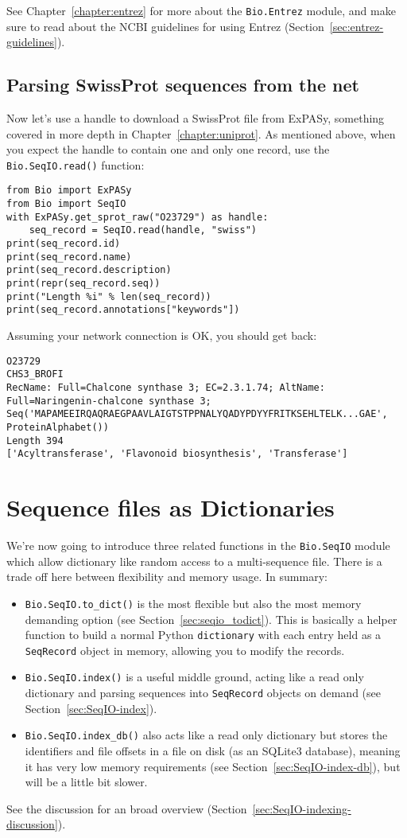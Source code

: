 See Chapter~\ref{chapter:entrez} for more about the \verb|Bio.Entrez| module, and make sure to read about the NCBI guidelines for using Entrez (Section~\ref{sec:entrez-guidelines}).

\subsection{Parsing SwissProt sequences from the net}
\label{sec:SeqIO_ExPASy_and_SwissProt}
Now let's use a handle to download a SwissProt file from ExPASy,
something covered in more depth in Chapter~\ref{chapter:uniprot}.
As mentioned above, when you expect the handle to contain one and only one record,
use the \verb|Bio.SeqIO.read()| function:

\begin{verbatim}
from Bio import ExPASy
from Bio import SeqIO
with ExPASy.get_sprot_raw("O23729") as handle:
    seq_record = SeqIO.read(handle, "swiss")
print(seq_record.id)
print(seq_record.name)
print(seq_record.description)
print(repr(seq_record.seq))
print("Length %i" % len(seq_record))
print(seq_record.annotations["keywords"])
\end{verbatim}

\noindent Assuming your network connection is OK, you should get back:

\begin{verbatim}
O23729
CHS3_BROFI
RecName: Full=Chalcone synthase 3; EC=2.3.1.74; AltName: Full=Naringenin-chalcone synthase 3;
Seq('MAPAMEEIRQAQRAEGPAAVLAIGTSTPPNALYQADYPDYYFRITKSEHLTELK...GAE', ProteinAlphabet())
Length 394
['Acyltransferase', 'Flavonoid biosynthesis', 'Transferase']
\end{verbatim}

\section{Sequence files as Dictionaries}

We're now going to introduce three related functions in the \verb|Bio.SeqIO|
module which allow dictionary like random access to a multi-sequence file.
There is a trade off here between flexibility and memory usage. In summary:
\begin{itemize}
\item \verb|Bio.SeqIO.to_dict()| is the most flexible but also the most
memory demanding option (see Section~\ref{sec:seqio_todict}). This is basically
a helper function to build a normal Python \verb|dictionary| with each entry
held as a \verb|SeqRecord| object in memory, allowing you to modify the
records.
\item \verb|Bio.SeqIO.index()| is a useful middle ground, acting like a
read only dictionary and parsing sequences into \verb|SeqRecord| objects
on demand (see Section~\ref{sec:SeqIO-index}).
\item \verb|Bio.SeqIO.index_db()| also acts like a read only dictionary
but stores the identifiers and file offsets in a file on disk (as an
SQLite3 database), meaning it has very low memory requirements (see
Section~\ref{sec:SeqIO-index-db}), but will be a little bit slower.
\end{itemize}
See the discussion for an broad overview
(Section~\ref{sec:SeqIO-indexing-discussion}).

